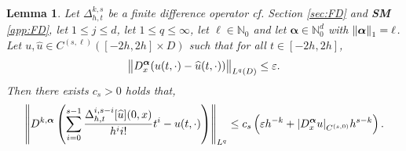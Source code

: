 \documentclass{article}
\numberwithin{equation}{section}
\newcommand{\N}{\mathbb{N}}
\newcommand{\bmalpha}{{\bm{\alpha}}}
\newcommand{\uhat}{{\widehat{u}}}
\renewcommand{\epsilon}{\varepsilon}
\newcommand{\1}{\mathbbm{1}}
\newtheorem{lemma}[theorem]{Lemma}
\begin{document}
\begin{lemma}\label{lem:newton-pol}
Let $\Delta^{k,s}_{h,t}$ be a finite difference operator cf. Section \ref{sec:FD} and \textbf{SM} \ref{app:FD}, let $1\leq j\leq d$, let $1\leq q\leq \infty$, let $\ell \in \N_0$ and let $\bmalpha\in\N^d_0$ with $\norm{\bmalpha}_1=\ell$. Let $u,\uhat\in C^{(s,\ell)}([-2h,2h]\times D)$ such that for all $t\in [-2h,2h]$,
\begin{equation}\label{eq:newton-u-uhat}
    \norm{D^{\bmalpha}_x(u(t,\cdot)-\uhat(t,\cdot))}_{L^q(D)} \leq \epsilon. 
\end{equation}
Then there exists $c_s>0$ holds that, 
\begin{equation}
    \norm{D^{k,\bmalpha}\left(\sum_{i=0}^{s-1}\frac{\Delta^{i,s-i}_{h,t}[\uhat](0,x)}{h^i i!}t^i-u(t,\cdot)\right)}_{L^q}\leq c_{s}\left(\epsilon h^{-k}+\abs{D^{\bmalpha}_xu}_{C^{(s,0)}}h^{s-k}\right).
\end{equation}
\end{lemma}
\end{document}
